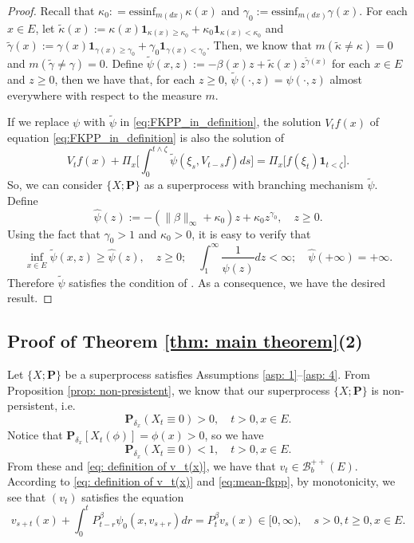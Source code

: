 \documentclass[12pt, a4paper]{amsart}
\theoremstyle{definition}
\numberwithin{equation}{section}
\begin{document}
\begin{proof}
    Recall that $\kappa_0 : = \text{essinf}_{m(dx)} \kappa(x) $ and $\gamma_0 := \text{essinf}_{m(dx)} \gamma(x)$.
	For each $x\in E$, let $\tilde \kappa(x) := \kappa(x) \mathbf 1_{\kappa(x)\geq \kappa_0} + \kappa_0 \mathbf 1_{\kappa(x) < \kappa_0}$ and $\tilde \gamma(x) := \gamma(x) \mathbf 1_{\gamma(x)\geq \gamma_0} + \gamma_0 \mathbf 1_{\gamma(x) < \gamma_0}$.
    Then, we know that $m(\tilde \kappa \neq \kappa) = 0$ and $m(\tilde \gamma \neq \gamma) = 0$.
	Define $\widetilde \psi(x,z) := - \beta(x)z+ \tilde \kappa(x)z^{\tilde \gamma(x)}$ for each $x\in E$ and $z\geq 0$, then we have that, for each $z\geq 0$, $\widetilde \psi(\cdot, z) = \psi(\cdot , z) $ almost everywhere with respect to the measure $m$.

	If we replace $\psi$ with $\tilde\psi$ in \eqref{eq:FKPP_in_definition}, the solution $V_tf(x)$ of equation \eqref{eq:FKPP_in_definition} is also the solution of
\[
	V_t f(x) + \Pi_x \Big[  \int_0^{t\wedge \zeta} \widetilde \psi (\xi_s,V_{t-s} f) ds \Big]
	=\Pi_x \big[ f(\xi_t)\mathbf 1_{t<\zeta} \big].
\]
	So, %
	we can consider
	$\{X; \mathbf P\}$ as a superprocess with branching mechanism $\tilde \psi$.
	Define 
\[
	\widehat\psi(z)
	:= - (\|\beta\|_\infty +\kappa_0 )z + \kappa_0 z^{\gamma_0},
	\quad z\geq 0.
\]
	Using the fact that $\gamma_0 > 1$ and $\kappa_0 > 0$, it is easy to verify that
\[
	\inf_{x\in E}\widetilde \psi(x,z)
	\geq \hat\psi(z),
	\quad z\geq 0;
	\quad \int_1^\infty \frac{1}{\widehat\psi(z)} dz
	< \infty;
	\quad \hat \psi(+\infty) = +\infty.
\]
	Therefore $\widetilde \psi$ satisfies the condition of \cite[Lemma 2.3]{RenSongZhang2015Limit}.
	As a consequence,
	we have the desired result.
\end{proof}

\subsection{Proof of Theorem \ref{thm: main theorem}(2)}
\label{sec: proof of result 2}
	Let $\{X; \mathbf P\}$ be a superprocess satisfies 
	Assumptions \ref{asp: 1}--\ref{asp: 4}.
	From Proposition \ref{prop: non-presistent}, we know that our superprocess $\{X;\mathbf P\}$ is non-persistent,
    i.e. 
\[
    \mathbf P_{\delta_x}(X_t \equiv 0) 
    > 0,
    \quad t>0, x \in E.
\]
	Notice that $\mathbf P_{\delta_x}[X_t(\phi)] = \phi(x)>0$, so we have 
\[
    \mathbf P_{\delta_x}(X_t \equiv 0)<1,
    \quad t>0, x \in E.
\]
	From these and \eqref{eq: definition of v_t(x)}, we have that $v_t \in \mathscr B^{++}_b(E)$.
	According to \eqref{eq: definition of v_t(x)} and \eqref{eq:mean-fkpp},
	by monotonicity, we see that $(v_t)$ satisfies the equation
\[
	v_{s+t}(x) + \int_0^t P^\beta_{t-r} \psi_0(x,v_{s+r}) dr
	= P^\beta_t v_s(x)
	\in [0,\infty),
	\quad s>0, t \geq 0,x \in E.
\]
\end{document}
